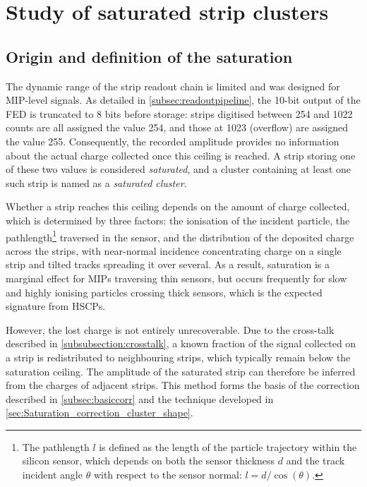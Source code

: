 \section{Study of saturated strip clusters}
\label{sec:Study_saturated_strip_clusters}

\subsection{Origin and definition of the saturation}
\label{subsec:saturationdefinition}

The dynamic range of the strip readout chain is limited and was designed for MIP-level signals. As detailed in \cref{subsec:readoutpipeline}, the 10-bit output of the FED is truncated to 8 bits before storage: strips digitised between 254 and 1022 counts are all assigned the value 254, and those at 1023 (overflow) are assigned the value 255. Consequently, the recorded amplitude provides no information about the actual charge collected once this ceiling is reached. A strip storing one of these two values is considered \textit{saturated}, and a cluster containing at least one such strip is named as a \textit{saturated cluster}.

\vspace{0.5 cm}

Whether a strip reaches this ceiling depends on the amount of charge collected, which is determined by three factors: the ionisation of the incident particle, the pathlength\footnote{The pathlength $l$ is defined as the length of the particle trajectory within the silicon sensor, which depends on both the sensor thickness $d$ and the track incident angle $\theta$ with respect to the sensor normal: $l=d/\cos(\theta)$.} traversed in the sensor, and the distribution of the deposited charge across the strips, with near-normal incidence concentrating charge on a single strip and tilted tracks spreading it over several. As a result, saturation is a marginal effect for MIPs traversing thin sensors, but occurs frequently for slow and highly ionising particles crossing thick sensors, which is the expected signature from HSCPs.

\vspace{0.5 cm}

However, the lost charge is not entirely unrecoverable. Due to the cross-talk described in \cref{subsubsection:crosstalk}, a known fraction of the signal collected on a strip is redistributed to neighbouring strips, which typically remain below the saturation ceiling. The amplitude of the saturated strip can therefore be inferred from the charges of adjacent strips. This method forms the basis of the correction described in \cref{subsec:basiccorr} and the technique developed in \cref{sec:Saturation_correction_cluster_shape}.


